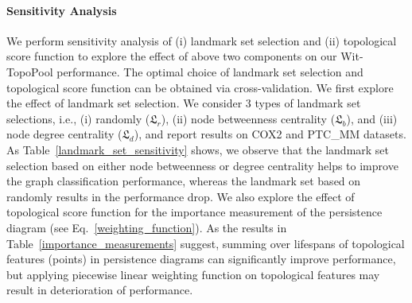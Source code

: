\documentclass[letterpaper]{article} %
\begin{document}
\begin{table}[h!]
\centering
\setlength{}
\caption{Ablation study of the Wit-TopoPool architecture.\label{ablation_architecture}}
\end{table}

\paragraph{Sensitivity Analysis} We perform sensitivity analysis of (i) landmark set selection and (ii) topological score function to explore the effect of above two components on our Wit-TopoPool performance. The optimal choice of landmark set selection and topological score function can be obtained via cross-validation. We first explore the effect of landmark set selection. We consider 3 types of landmark set selections, i.e., (i) randomly ($\mathfrak{L}_r$), (ii) node betweenness centrality ($\mathfrak{L}_b$), and (iii) node degree centrality ($\mathfrak{L}_d$), and report results on COX2 and PTC\_MM datasets. As Table~\ref{landmark_set_sensitivity} shows, we observe that the landmark set selection based on either node betweenness or degree centrality helps to improve the graph classification performance, whereas the landmark set based on randomly results in the performance drop. We also explore the effect of topological score function for the importance measurement of the persistence diagram (see Eq.~\ref{weighting_function}). As the results in Table~\ref{importance_measurements} suggest, summing over lifespans of topological features (points) in persistence diagrams can significantly improve performance, but applying piecewise linear weighting function on topological features may result in deterioration of performance.
\end{document}
